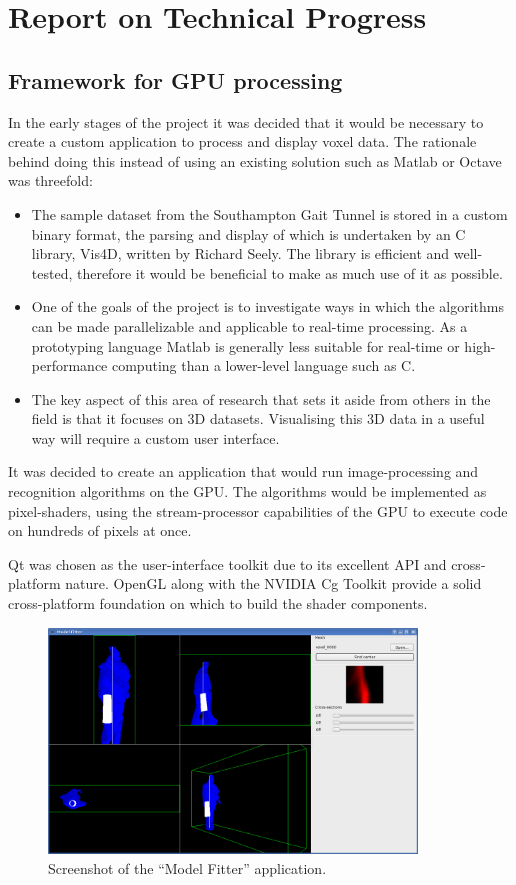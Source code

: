 \section{Report on Technical Progress}

\subsection{Framework for GPU processing}

In the early stages of the project it was decided that it would be necessary to create a custom application to process and display voxel data.
The rationale behind doing this instead of using an existing solution such as Matlab or Octave was threefold:

\begin{itemize}
	\item The sample dataset from the Southampton Gait Tunnel is stored in a custom binary format, the parsing and display of which is
		undertaken by an C library, Vis4D, written by Richard Seely.
		The library is efficient and well-tested, therefore it would be beneficial to make as much use of it as possible.
	\item One of the goals of the project is to investigate ways in which the algorithms can be made parallelizable and applicable to real-time processing.
		As a prototyping language Matlab is generally less suitable for real-time or high-performance computing than a lower-level language such as C.
	\item The key aspect of this area of research that sets it aside from others in the field is that it focuses on 3D datasets.
		Visualising this 3D data in a useful way will require a custom user interface.
\end{itemize}

It was decided to create an application that would run image-processing and recognition algorithms on the GPU.
The algorithms would be implemented as pixel-shaders, using the stream-processor capabilities of the GPU to execute code on hundreds of pixels at once.

Qt was chosen as the user-interface toolkit due to its excellent API and cross-platform nature.
OpenGL along with the NVIDIA Cg Toolkit provide a solid cross-platform foundation on which to build the shader components.

\begin{figure}[tb]
	\centering
	\includegraphics[height=6cm]{screenshot.png}
	\caption{Screenshot of the ``Model Fitter'' application.}
	\label{Screenshot}
\end{figure}

